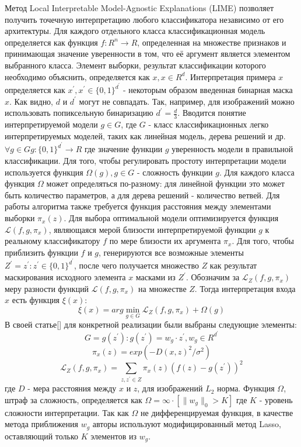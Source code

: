 \documentclass[oneside,final,14pt]{extreport}
\begin{document}
Метод Local Interpretable Model-Agnostic Explanations (LIME) позволяет получить точечную интерпретацию любого классификатора независимо от его архитектуры. Для каждого отдельного класса классификационная модель определяется как функция $f: R^n \rightarrow R$, определенная на множестве признаков и принимающая значение уверенности в том, что её аргумент является элементом выбранного класса. Элемент выборки, результат классификации которого необходимо объяснить, определяется как $x, x\in R^d$. Интерпретация примера $x$ определяется как $x^\prime, x^\prime \in \{0,1\}^{d^\prime}$ - некоторым образом введенная бинарная маска $x$. Как видно, $d$ и $d^\prime$ могут не совпадать. Так, например, для изображений можно использовать попиксельную бинаризацию $d^\prime = \frac{d}{3}$. Вводится понятие интерпретируемой модели $g\in G$, где $G$ - класс классификационных легко интерпретируемых моделей, таких как линейная модель, дерева решений и др. $\forall g\in G g:  \{0,1\}^{d^\prime} \rightarrow R$ где значение функции $g$ уверенность модели в правильной классификации. Для того, чтобы регулировать простоту интерпретации модели используется функция $\Omega(g), g \in G$ - сложность функции $g$. Для каждого класса функция $\Omega$ может определяться по-разному: для линейной функции это может быть количество параметров, а для дерева решений - количество ветвей. Для работы алгоритма также требуется функция расстояния между элементами выборки $\pi_x(z)$. Для выбора оптимальной модели оптимизируется функция  $\mathcal{L}(f,g,\pi_x)$, являющаяся мерой близости интерпретируемой функции $g$ к реальному классификатору $f$ по мере близости их аргумента $\pi_x$. Для того, чтобы приблизить функции $f$ и $g$, генерируются все возможные элементы $Z^\prime= z^\prime: z^\prime \in \{0,1\}^{d^\prime}$, после чего получается множество $Z$ как результат маскирования исходного элемента $x$ масками из $Z^\prime$. Обозначим за  $\mathcal{L}_Z(f,g,\pi_x)$ меру разности функций $\mathcal{L}(f,g,\pi_x)$ на множестве $Z$. Тогда интерпретация входа $x$ есть функция $\xi(x)$:
$$
\xi(x) = arg\min_{g\in G} \mathcal{L}_Z(f,g,\pi_x) + \Omega(g)
$$
В своей статье[] для конкретной реализации были выбраны следующие элементы:
$$
G = g(z^\prime): g(z^\prime)=w_g \cdot z^\prime, w_g \in R^{d^\prime}
$$
$$\pi_x(z) = exp(-D(x,z)^2/\sigma^2)$$
$$\mathcal{L}_Z(f,g,\pi_x) = 
\displaystyle\sum_{z,z^\prime \in Z}{} \pi_x(z)(f(z) - g(z^\prime))^2
$$
где $D$ - мера расстояния между $x$ и $z$, для изображений $L_2$ норма.  Функция $\Omega$, штраф за сложность, определяется как $\Omega = \infty \cdot [\|w_g\|_0 > K]$ где $K$ - уровень сложности интерпретации. Так как $\Omega$ не дифференцируемая функция,  в качестве метода приближения $w_g$ авторы используют модифицированный метод Lasso, оставляющий только $K$ элементов из $w_g$.  
\end{document}
